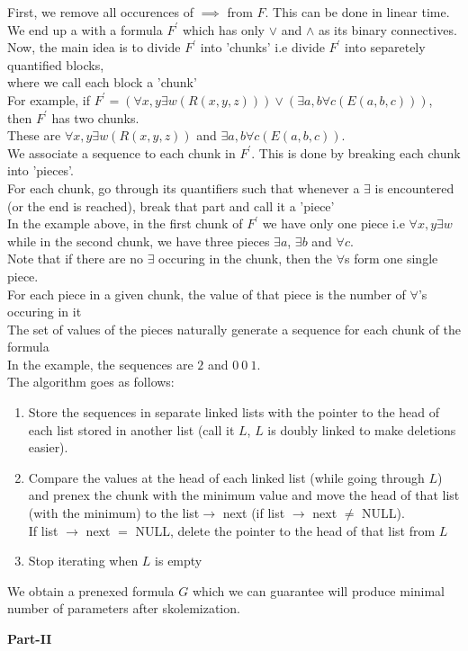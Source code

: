 \documentclass{article}
\begin{document}
\begin{flushleft}
First, we remove all occurences of $\implies$ from $F$. This can be done in linear time.\\
We end up a with a formula $F^{'}$ which has only $\vee$ and $\wedge$ as its binary connectives.\\
Now, the main idea is to divide $F^{'}$ into 'chunks' i.e divide $F^{'}$ into separetely quantified blocks,\\
where we call each block a 'chunk'\\
For example, if $F^{'}= (\forall x,y\exists w(R(x,y,z)))\vee (\exists a,b\forall c(E(a,b,c)))$, then $F^{'}$ has two chunks.\\
These are $\forall x,y\exists w(R(x,y,z))$ and $\exists a,b\forall c(E(a,b,c))$.\\
We associate a sequence to each chunk in $F^{'}$. This is done by breaking each chunk into 'pieces'.\\
For each chunk, go through its quantifiers such that whenever a $\exists$ is encountered (or the end is reached), break that part and call it a 'piece'\\
In the example above, in the first chunk of $F^{'}$ we have only one piece i.e $\forall x,y\exists w$\\
while in the second chunk, we have three pieces $\exists a$, $\exists b$ and $\forall c$.\\
Note that if there are no $\exists$ occuring in the chunk, then the $\forall$s form one single piece.\\
For each piece in a given chunk, the value of that piece is the number of $\forall$'s occuring in it\\
The set of values of the pieces naturally generate a sequence for each chunk of the formula\\
In the example, the sequences are $2$ and $0 \:0\:1$.\\
The algorithm goes as follows: \\
\begin{enumerate}
\item Store the sequences in separate linked lists with the pointer to the head of each list stored in another list (call it $L$, $L$ is doubly linked to make deletions easier).\\
\item Compare the values at the head of each linked list (while going through $L$) and prenex the chunk with the minimum value and move the head of that list (with the minimum) to the list$\rightarrow$ next (if list $\rightarrow$ next $\neq$ NULL).\\
      If list $\rightarrow$ next $=$ NULL, delete the pointer to the head of that list from $L$
\item Stop iterating when $L$ is empty
\end{enumerate}
We obtain a prenexed formula $G$ which we can guarantee will produce minimal number of parameters after skolemization.\\
\clearpage
\begin{center} \textbf{\Large Part-II}\end{center}

\end{flushleft}
\end{document}
